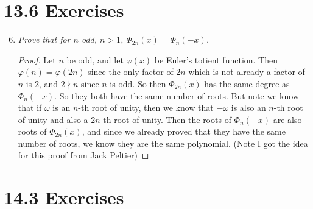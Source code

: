 \documentclass[10pt,oneside,reqno]{amsart}
\theoremstyle{plain}
\theoremstyle{definition}
\theoremstyle{remark}
\theoremstyle{plain}
\renewcommand{\phi}{\varphi}
\begin{document}
\section*{13.6 Exercises}

\begin{enumerate}[label=\arabic*.]
\setcounter{enumi}{5}
\item \textit{Prove that for $n$ odd, $n> 1$, $\Phi_{2n}(x) = \Phi_n(-x)$. }

\begin{proof}
Let $n$ be odd, and let $\phi(x)$ be Euler's totient function. Then $\phi(n) = \phi(2n)$ since the only factor of $2n$ which is not already a factor of $n$ is 2, and $2\nmid n$ since $n$ is odd. So then $\Phi_{2n}(x)$ has the same degree as $\Phi_n(-x)$. So they both have the same number of roots. But note we know that if $\omega$ is an $n$-th root of unity, then we know that $-\omega$ is also an $n$-th root of unity and also a $2n$-th root of unity. Then the roots of $\Phi_{n}(-x)$ are also roots of $\Phi_{2n}(x)$, and since we already proved that they have the same number of roots, we know they are the same polynomial. (Note I got the idea for this proof from Jack Peltier)
\end{proof}
\end{enumerate}

\section*{14.3 Exercises}
\end{document}
